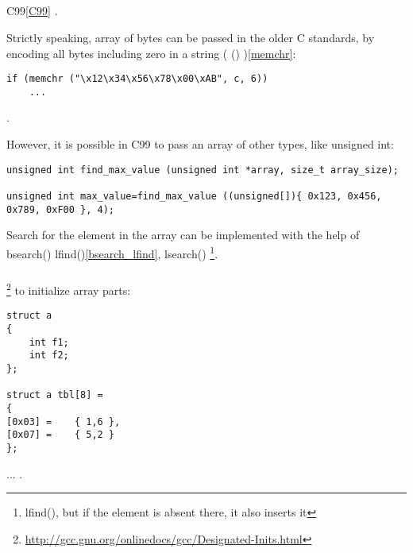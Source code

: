 ﻿\subsection{}

 C99\ref{C99} 
.

{Strictly speaking, array of bytes can be passed in the older C standards, by encoding all bytes
including zero in a string}
( ()
)\ref{memchr}:

\begin{lstlisting}
if (memchr ("\x12\x34\x56\x78\x00\xAB", c, 6))
	...
\end{lstlisting}

.

{However, it is possible in C99 to pass an array of other types, like}
unsigned int:

\begin{lstlisting}
unsigned int find_max_value (unsigned int *array, size_t array_size);

unsigned int max_value=find_max_value ((unsigned[]){ 0x123, 0x456, 0x789, 0xF00 }, 4);
\end{lstlisting}

{Search for the element in the array can be implemented with the help of} bsearch() \OrENRU lfind()\ref{bsearch_lfind}, 
 lsearch()
\footnote{ lfind(), 
{but if the element is absent there, it also inserts it}}.

\subsubsection{}

\footnote{\url{http://gcc.gnu.org/onlinedocs/gcc/Designated-Inits.html}} 
{to initialize array parts}:

\begin{lstlisting}
struct a
{
	int f1;
	int f2;
};
 
struct a tbl[8] =
{
[0x03] =	{ 1,6 },
[0x07] =	{ 5,2 } 
};
\end{lstlisting}

... .

